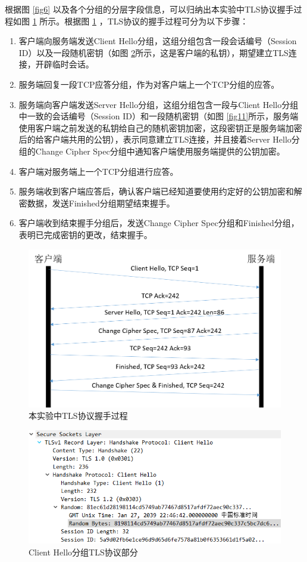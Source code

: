 \qquad
根据图 \ref{fig6} 以及各个分组的分层字段信息，可以归纳出本实验中TLS协议握手过程如图 \ref{fig9} 所示。根据图 \ref{fig9} ，TLS协议的握手过程可分为以下步骤：\\
\begin{enumerate}
	\item 客户端向服务端发送Client Hello分组，这组分组包含一段会话编号（Session ID）以及一段随机密钥（如图 \ref{fig10}所示，这是客户端的私钥），期望建立TLS连接，开辟临时会话。
	\item 服务端回复一段TCP应答分组，作为对客户端上一个TCP分组的应答。
	\item 服务端向客户端发送Server Hello分组，这组分组包含一段与Client Hello分组中一致的会话编号（Session ID）和一段随机密钥（如图 \ref{fig11}所示，服务端使用客户端之前发送的私钥给自己的随机密钥加密，这段密钥正是服务端加密后的给客户端共用的公钥），表示同意建立TLS连接，并且接着Server Hello分组的Change Cipher Spec分组中通知客户端使用服务端提供的公钥加密。
	\item 客户端对服务端上一个TCP分组进行应答。
	\item 服务端收到客户端应答后，确认客户端已经知道要使用约定好的公钥加密和解密数据，发送Finished分组期望结束握手。
	\item 客户端收到结束握手分组后，发送Change Cipher Spec分组和Finished分组，表明已完成密钥的更改，结束握手。
\end{enumerate}
\begin{figure}
	\centering
	\includegraphics[width=12cm]{image/TLS-Handshake-1}
	\caption{本实验中TLS协议握手过程}
	\label{fig9}
\end{figure}
\begin{figure}
	\centering
	\includegraphics[width=12cm]{image/TLS-Handshake-2}
	\caption{Client Hello分组TLS协议部分}
	\label{fig10}
\end{figure}
